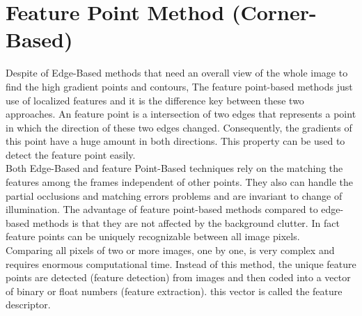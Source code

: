\section{Feature Point Method (Corner-Based)} \label{sec:feature_point_method}
Despite of Edge-Based methods that need an overall view of the whole image to find the high gradient points and contours, The feature point-based methods just use of localized features and it is the difference key between these two approaches. An feature point is a intersection of two edges that represents a point in which the direction of these two edges changed. Consequently, the gradients of this point have a huge amount in both directions. This property can be used to detect the feature point easily.\\
Both Edge-Based and feature Point-Based techniques rely on the matching the features among the frames independent of other points. They also can handle the partial occlusions and matching errors problems and are invariant to change of illumination. The advantage of feature point-based methods compared to edge-based methods is that they are not affected by the background clutter. In fact feature points can be uniquely recognizable between all image pixels.\\
Comparing all pixels of two or more images, one by one, is very complex and requires enormous computational time. Instead of this method, the unique feature points are detected (feature detection) from images and then coded into a vector of binary or float numbers (feature extraction). this vector is called the feature descriptor.\\

